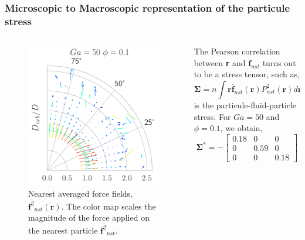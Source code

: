 \documentclass{sintefbeamer}
\newcommand{\nstavg}[1]{\overline{#1}_{nst}}
\begin{document}
\begin{frame}
  \frametitle{Microscopic to Macroscopic representation of the particule stress}
  \begin{columns}[c]
    \begin{column}{0.5\textwidth}
      \begin{figure}
    
        \includegraphics[height=0.6\textwidth]{image/Dim_3/fDrop/Dmin_Theta_Fh_Ga_50_PHI_0_1.pdf}
        
        \caption{Nearest averaged force fields, $\nstavg{\textbf{f}^2}(\textbf{r})$. 
        The color map scales the magnitude of the force applied on the nearest particle $\nstavg{\textbf{f}^2}$.}
      \end{figure}
    \end{column}
    \begin{column}{0.5\textwidth}
      The Pearson correlation between \textbf{r} and $\nstavg{\textbf{f}}$ turns out to be a stress tensor, such as, 
      \begin{equation*}
        \bm{\Sigma} = n \int \textbf{r} 
        \nstavg{\textbf{f}}(\textbf{r})
        P^2_{nst}(\textbf{r})
        d\textbf{r},
      \end{equation*}
      is the particule-fluid-particle stress. 
      For $Ga = 50$ and $\phi = 0.1$, we obtain, 
      \begin{equation*}
        \bm{\Sigma}^* = -\left[
          \begin{matrix}
            0.18 & 0 & 0 \\
            0 & 0.59 & 0 \\
            0 & 0 & 0.18 
          \end{matrix}
        \right]
      \end{equation*}
    \end{column}
  \end{columns}
\end{frame}
\end{document}
